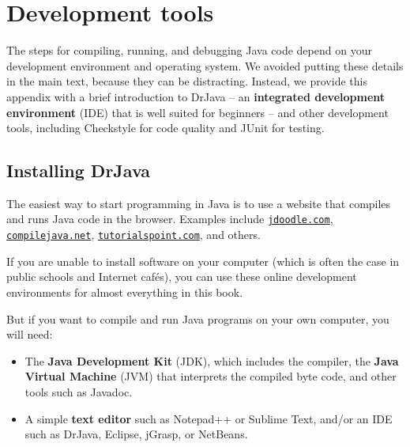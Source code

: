 \documentclass[12pt]{book}
\theoremstyle{exercise}
\begin{document}
\appendix
\renewcommand{\chaptermark}[1]{\markboth{Appendix \thechapter ~~ #1}{}}


\chapter{Development tools}
\label{development}

The steps for compiling, running, and debugging Java code depend on your development environment and operating system.
We avoided putting these details in the main text, because they can be distracting.
Instead, we provide this appendix with a brief introduction to DrJava -- an {\bf integrated development environment} (IDE) that is well suited for beginners -- and other development tools, including Checkstyle for code quality and JUnit for testing.



\section{Installing DrJava}
\label{drjava}

The easiest way to start programming in Java is to use a website that compiles and runs Java code in the browser.
Examples include \href{https://www.jdoodle.com/}{\tt jdoodle.com}, \href{https://www.compilejava.net/}{\tt compilejava.net}, \href{http://tutorialspoint.com/}{\tt tutorialspoint.com}, and others.

If you are unable to install software on your computer (which is often the case in public schools and Internet caf\'{e}s), you can use these online development environments for almost everything in this book.

But if you want to compile and run Java programs on your own computer, you will need:

\begin{itemize}

\item The {\bf Java Development Kit} (JDK), which includes the compiler, the {\bf Java Virtual Machine} (JVM) that interprets the compiled byte code, and other tools such as Javadoc.



\item A simple {\bf text editor} such as Notepad++ or Sublime Text, and/or an IDE such as DrJava, Eclipse, jGrasp, or NetBeans.

\end{itemize}
\end{document}
